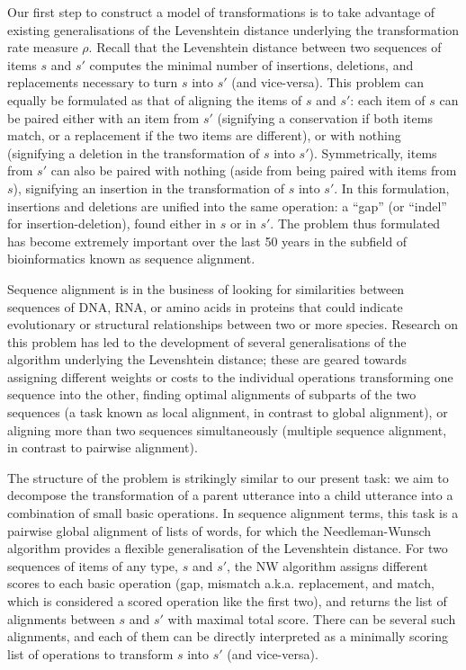 Our first step to construct a model of transformations is to take
advantage of existing generalisations of the Levenshtein distance
underlying the transformation rate measure \(\rho\). Recall that the
Levenshtein distance between two sequences of items \(s\) and \(s'\)
computes the minimal number of insertions, deletions, and replacements
necessary to turn \(s\) into \(s'\) (and vice-versa). This problem can
equally be formulated as that of aligning the items of \(s\) and \(s'\):
each item of \(s\) can be paired either with an item from \(s'\)
(signifying a conservation if both items match, or a replacement if the
two items are different), or with nothing (signifying a deletion in the
transformation of \(s\) into \(s'\)). Symmetrically, items from \(s'\)
can also be paired with nothing (aside from being paired with items from
\(s\)), signifying an insertion in the transformation of \(s\) into
\(s'\). In this formulation, insertions and deletions are unified into
the same operation: a \enquote{gap} (or \enquote{indel} for
insertion-deletion), found either in \(s\) or in \(s'\). The problem
thus formulated has become extremely important over the last 50 years in
the subfield of bioinformatics known as sequence alignment.

Sequence alignment is in the business of looking for similarities
between sequences of DNA, RNA, or amino acids in proteins that could
indicate evolutionary or structural relationships between two or more
species. Research on this problem has led to the development of several
generalisations of the algorithm underlying the Levenshtein distance;
these are geared towards assigning different weights or costs to the
individual operations transforming one sequence into the other, finding
optimal alignments of subparts of the two sequences (a task known as
local alignment, in contrast to global alignment), or aligning more than
two sequences simultaneously (multiple sequence alignment, in contrast
to pairwise alignment).

The structure of the problem is strikingly similar to our present task:
we aim to decompose the transformation of a parent utterance into a
child utterance into a combination of small basic operations. In
sequence alignment terms, this task is a pairwise global alignment of
lists of words, for which the Needleman-Wunsch algorithm
\autocite[henceforth NW]{needleman_general_1970} provides a flexible
generalisation of the Levenshtein distance. For two sequences of items
of any type, \(s\) and \(s'\), the NW algorithm assigns different scores
to each basic operation (gap, mismatch a.k.a. replacement, and match,
which is considered a scored operation like the first two), and returns
the list of alignments between \(s\) and \(s'\) with maximal total
score. There can be several such alignments, and each of them can be
directly interpreted as a minimally scoring list of operations to
transform \(s\) into \(s'\) (and vice-versa).


